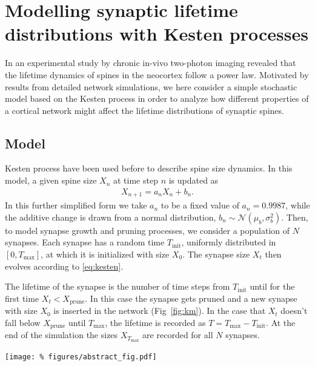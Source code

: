 \columnbreak
\section*{\LARGE Modelling synaptic lifetime distributions with Kesten processes}

In an experimental study by \textcite{Loewenstein2015} chronic in-vivo two-photon imaging revealed that the lifetime dynamics of spines in the neocortex follow a power law. Motivated by results from detailed network simulations, we here consider a simple stochastic model based on the Kesten process in order to analyze how different properties of a cortical network might affect the lifetime distributions of synaptic spines.

\subsection*{Model}

Kesten process have been used before \cite{Statman2014} to describe spine size dynamics. In this model, a given spine size $X_n$ at time step $n$ is updated as
%
\begin{align}
  X_{n+1} = a_n X_n + b_n. \label{eq:kesten}
\end{align}
%
In this further simplified form we take $a_n$ to be a fixed value of $a_n=0.9987$, while the additive change is drawn from a normal distribution, $b_n \sim \mathcal{N}(\mu_b, \sigma_b^2)$. Then, to model synapse growth and pruning processes, we consider a population of $N$ synapses. Each synapse has a random time $T_{\mathrm{init}}$, uniformly distributed in $[0,T_{\text{max}}]$, at which it is initialized with size $X_0$. The synapse size $X_t$ then evolves according to \eqref{eq:kesten}.

The lifetime of the synapse is the number of time steps from $T_{\text{init}}$ until for the first time $X_t < X_{\mathrm{prune}}$. In this case the synapse gets pruned and a new synapse with size $X_0$ is inserted in the network (Fig~\ref{fig:km}). In the case that $X_t$ doesn't fall below $X_{\mathrm{prune}}$ until $T_{\text{max}}$, the lifetime is recorded as $T=T_{\text{max}}-T_{\text{init}}$. At the end of the simulation the sizes $X_{T_{\text{max}}}$ are recorded for all $N$ synapses.

\begin{center}\vspace{1cm}
  \texttt{[image: \%
    figures/abstract\_fig.pdf]}
  \label{fig:km}
\end{center}\vspace{1cm}


